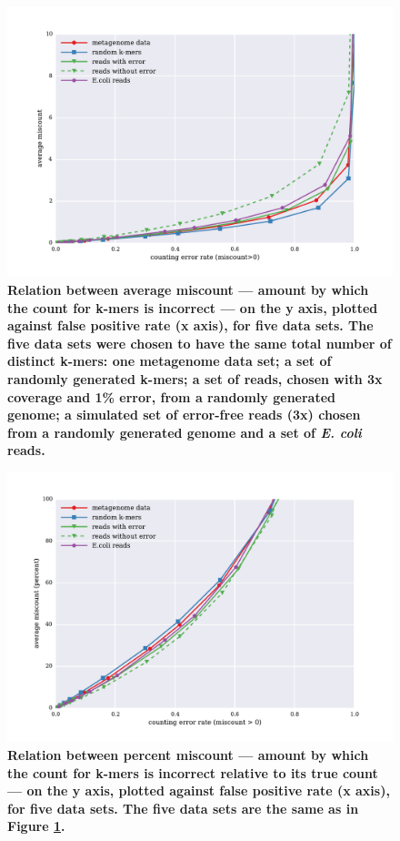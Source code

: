 \documentclass[10pt]{article}
\begin{document}
\begin{figure}[!ht]
\centerline{\includegraphics[width=5in]{./figure/average_offset_vs_fpr}}
\caption{\bf Relation between average miscount --- amount by which
the count for k-mers is incorrect --- on the y axis, plotted against
false positive rate (x axis), for five data sets.  The five data
sets were chosen to have the same total number of distinct k-mers: one
metagenome data set; a set of randomly generated k-mers; a set
of reads, chosen with 3x coverage and 1\% error, from a randomly generated
genome; a simulated set of error-free reads (3x) chosen from a randomly
generated genome and a set of {\em E. coli} reads.}
\label{fig:average_offset_vs_fpr}
\end{figure}

\begin{figure}[!ht]
\centerline{\includegraphics[width=5in]{./figure/percent_offset_vs_fpr}}
\caption{\bf Relation between percent miscount --- amount by which the
  count for k-mers is incorrect relative to its true count --- on the
  y axis, plotted against false positive rate (x axis), for five data
  sets.  The five data sets are the same as in Figure
  \ref{fig:average_offset_vs_fpr}.}
\label{fig:percent_offset_vs_fpr}
\end{figure}
\end{document}
